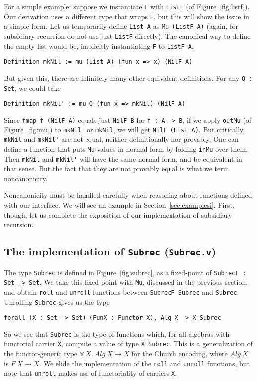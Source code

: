 \documentclass[a4paper,USenglish]{lipics-v2021}
\begin{document}
For a simple example: suppose we instantiate \verb|F| with
\verb|ListF| (of Figure~\ref{fig:listf}).  Our derivation uses a
different type that wraps \verb|F|, but this will show the issue in a
simple form.  Let us temporarily define \verb|List A| as
\verb|Mu (ListF A)| (again, for subsidiary recursion do not use just
\verb|ListF| directly).  The canonical way to define the empty list
would be, implicitly instantiating \verb|F| to \verb|ListF A|,
\begin{verbatim}
Definition mkNil := mu (List A) (fun x => x) (NilF A)
\end{verbatim}
\noindent But given this, there are infinitely many other equivalent
definitions.  For any \verb|Q : Set|, we could take
\begin{verbatim}
Definition mkNil' := mu Q (fun x => mkNil) (NilF A)
\end{verbatim}
\noindent Since \verb|fmap f (NilF A)| equals just \verb|NilF B| for
\verb|f : A -> B|, if we apply \verb|outMu| (of Figure~\ref{fig:mu})
to \verb|mkNil'| or \verb|mkNil|, we will get \verb|NilF (List A)|.
But critically, \verb|mkNil| and \verb|mkNil'| are not equal, neither
definitionally nor provably.  One can define a function that puts
\verb|Mu| values in normal form by folding \verb|inMu| over them.
Then \verb|mkNil| and \verb|mkNil'| will have the same normal form,
and be equivalent in that sense.  But the fact that they are not
provably equal is what we term noncanonicity.  

Noncanonicity must be handled carefully when reasoning about functions
defined with our interface.  We will see an example in
Section~\ref{sec:examplesi}.  First, though, let us complete the
exposition of our implementation of subsidiary recursion.

\subsection{The implementation of \texttt{Subrec} (\texttt{Subrec.v})}
\label{sec:subrecimpl}

The type \verb|Subrec| is defined in Figure~\ref{fig:subrec}, as a
fixed-point of \verb|SubrecF : Set -> Set|.  We take this fixed-point
with \verb|Mu|, discussed in the previous section, and obtain \verb|roll|
and \verb|unroll| functions between \verb|SubrecF Subrec| and \verb|Subrec|.
Unrolling \verb|Subrec| gives us the type
\begin{verbatim}
forall (X : Set -> Set) (FunX : Functor X), Alg X -> X Subrec
\end{verbatim}
\noindent So we see that \verb|Subrec| is the type of functions which,
for all algebras with functorial carrier
\verb|X|, compute a value of type \verb|X Subrec|.  This is a
generalization of the functor-generic type
$\forall\ X.\ \textit{Alg}\ X \to X$ for the Church encoding, where
$\textit{Alg}\ X$ is $F\ X \to X$.  We elide the implementation of the
\verb|roll| and \verb|unroll| functions, but note that \verb|unroll|
makes use of functoriality of carriers \verb|X|.
\end{document}
